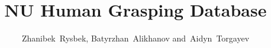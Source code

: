 \documentclass[journal]{IEEEtran}
\begin{document}
%
\title{ NU Human Grasping Database}
%
%
%

\author{Zhanibek~Rysbek,
        Batyrzhan~Alikhanov
        and~Aidyn~Torgayev}%

% 
%



% 
\end{document}
